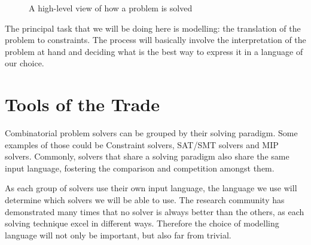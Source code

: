 \begin{figure}[h]
    \label{fig-modelling}
    \centering
    \caption{A high-level view of how a problem is solved}
\end{figure}

The principal task that we will be doing here is modelling: the translation of
the problem to constraints. The process will basically involve the
interpretation of the problem at hand and deciding what is the best way to
express it in a language of our choice.

\section{Tools of the Trade}

Combinatorial problem solvers can be grouped by their solving paradigm. Some
examples of those could be Constraint solvers, SAT/SMT solvers and MIP solvers.
Commonly, solvers that share a solving paradigm also share the same input
language, fostering the comparison and competition amongst them. 

As each group of solvers use their own input language, the language we use will
determine which solvers we will be able to use.
The research community has demonstrated many times that no solver is
always better than the others, as each solving technique excel in different
ways. Therefore the choice of modelling language will not only be important, but
also far from trivial.

